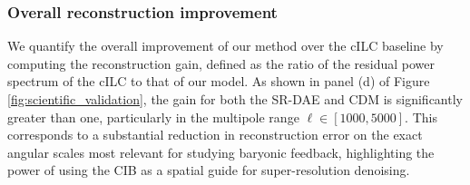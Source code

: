 \documentclass[]{article}
\begin{document}
\subsubsection{Overall reconstruction improvement}
We quantify the overall improvement of our method over the cILC baseline by computing the reconstruction gain, defined as the ratio of the residual power spectrum of the cILC to that of our model. As shown in panel (d) of Figure \ref{fig:scientific_validation}, the gain for both the SR-DAE and CDM is significantly greater than one, particularly in the multipole range $\ell \in [1000, 5000]$. This corresponds to a substantial reduction in reconstruction error on the exact angular scales most relevant for studying baryonic feedback, highlighting the power of using the CIB as a spatial guide for super-resolution denoising.
\end{document}
